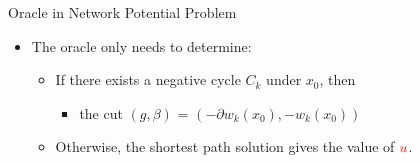 \documentclass[
  ignorenonframetext,
  aspectratio=169,
  serif,onlymath]{beamer}
\providecommand{\tightlist}{%
  \setlength{\itemsep}{0pt}\setlength{\parskip}{0pt}}
\begin{document}
\begin{frame}{Oracle in Network Potential Problem}
\protect\hypertarget{oracle-in-network-potential-problem}{}

\begin{itemize}
\tightlist
\item
  The oracle only needs to determine:

  \begin{itemize}
  \tightlist
  \item
    If there exists a negative cycle \(C_k\) under \(x_0\), then

    \begin{itemize}
    \tightlist
    \item
      the cut \((g, \beta)\) = \((-\partial w_k(x_0), -w_k(x_0))\)
    \end{itemize}
  \item
    Otherwise, the shortest path solution gives the value of
    \({\color{red}u}\).
  \end{itemize}
\end{itemize}

\end{frame}
\end{document}
